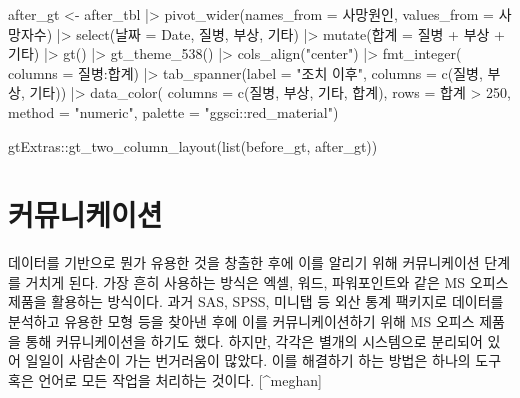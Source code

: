 \documentclass[
  letterpaper,
  chapter,a4paper,showtrims,openright,hidelinks]{oblivoir}
\newenvironment{Shaded}{\begin{snugshade}}{\end{snugshade}}
\newcommand{\AttributeTok}[1]{\textcolor[rgb]{0.40,0.45,0.13}{#1}}
\newcommand{\DecValTok}[1]{\textcolor[rgb]{0.68,0.00,0.00}{#1}}
\newcommand{\FunctionTok}[1]{\textcolor[rgb]{0.28,0.35,0.67}{#1}}
\newcommand{\NormalTok}[1]{\textcolor[rgb]{0.00,0.23,0.31}{#1}}
\newcommand{\OtherTok}[1]{\textcolor[rgb]{0.00,0.23,0.31}{#1}}
\newcommand{\SpecialCharTok}[1]{\textcolor[rgb]{0.37,0.37,0.37}{#1}}
\newcommand{\StringTok}[1]{\textcolor[rgb]{0.13,0.47,0.30}{#1}}
\begin{document}
\begin{Shaded}
\begin{Highlighting}[]
\NormalTok{after\_gt }\OtherTok{\textless{}{-}}\NormalTok{ after\_tbl }\SpecialCharTok{|\textgreater{}} 
  \FunctionTok{pivot\_wider}\NormalTok{(}\AttributeTok{names\_from =}\NormalTok{ 사망원인, }\AttributeTok{values\_from =}\NormalTok{ 사망자수) }\SpecialCharTok{|\textgreater{}} 
  \FunctionTok{select}\NormalTok{(날짜 }\OtherTok{=}\NormalTok{ Date, 질병, 부상, 기타) }\SpecialCharTok{|\textgreater{}} 
  \FunctionTok{mutate}\NormalTok{(합계 }\OtherTok{=}\NormalTok{ 질병 }\SpecialCharTok{+}\NormalTok{ 부상 }\SpecialCharTok{+}\NormalTok{ 기타) }\SpecialCharTok{|\textgreater{}} 
  \FunctionTok{gt}\NormalTok{() }\SpecialCharTok{|\textgreater{}} 
    \FunctionTok{gt\_theme\_538}\NormalTok{() }\SpecialCharTok{|\textgreater{}} 
    \FunctionTok{cols\_align}\NormalTok{(}\StringTok{"center"}\NormalTok{) }\SpecialCharTok{|\textgreater{}} 
    \FunctionTok{fmt\_integer}\NormalTok{( }\AttributeTok{columns =}\NormalTok{ 질병}\SpecialCharTok{:}\NormalTok{합계) }\SpecialCharTok{|\textgreater{}} 
  \FunctionTok{tab\_spanner}\NormalTok{(}\AttributeTok{label =} \StringTok{"조치 이후"}\NormalTok{, }\AttributeTok{columns =} \FunctionTok{c}\NormalTok{(질병, 부상, 기타)) }\SpecialCharTok{|\textgreater{}} 
  \FunctionTok{data\_color}\NormalTok{(}
    \AttributeTok{columns =} \FunctionTok{c}\NormalTok{(질병, 부상, 기타, 합계),}
    \AttributeTok{rows =}\NormalTok{ 합계 }\SpecialCharTok{\textgreater{}} \DecValTok{250}\NormalTok{,      }
    \AttributeTok{method =} \StringTok{"numeric"}\NormalTok{,}
    \AttributeTok{palette =} \StringTok{"ggsci::red\_material"}\NormalTok{)}

\NormalTok{gtExtras}\SpecialCharTok{::}\FunctionTok{gt\_two\_column\_layout}\NormalTok{(}\FunctionTok{list}\NormalTok{(before\_gt, after\_gt))}
\end{Highlighting}
\end{Shaded}

\hypertarget{uxcee4uxbba4uxb2c8uxcf00uxc774uxc158}{%
\section{커뮤니케이션}\label{uxcee4uxbba4uxb2c8uxcf00uxc774uxc158}}

데이터를 기반으로 뭔가 유용한 것을 창출한 후에 이를 알리기 위해
커뮤니케이션 단계를 거치게 된다. 가장 흔히 사용하는 방식은 엑셀, 워드,
파워포인트와 같은 MS 오피스 제품을 활용하는 방식이다. 과거 SAS, SPSS,
미니탭 등 외산 통계 팩키지로 데이터를 분석하고 유용한 모형 등을 찾아낸
후에 이를 커뮤니케이션하기 위해 MS 오피스 제품을 통해 커뮤니케이션을
하기도 했다. 하지만, 각각은 별개의 시스템으로 분리되어 있어 일일이
사람손이 가는 번거러움이 많았다. 이를 해결하기 하는 방법은 하나의 도구
혹은 언어로 모든 작업을 처리하는 것이다. {[}\^{}meghan{]}
\end{document}
